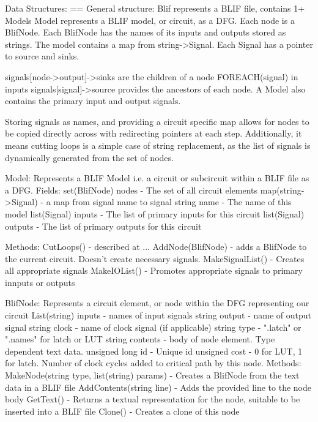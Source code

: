 \documentclass[12pt,draft,oneside]{article} %
\begin{document}
Data Structures:
==
General structure:
Blif represents a BLIF file, contains 1+ Models
Model represents a BLIF model, or circuit, as a DFG.
Each node is a BlifNode.
Each BlifNode has the names of its inputs and outputs stored as strings.
The model contains a map from string->Signal.
Each Signal has a pointer to source and sinks.

signals[node->output]->sinks are the children of a node
FOREACH(signal) in inputs
   signals[signal]->source
provides the ancestors of each node.
A Model also contains the primary input and output signals.

Storing signals as names, and providing a circuit specific map allows for nodes
to be copied directly across with redirecting pointers at each step.
Additionally, it means cutting loops is a simple case of string replacement,
as the list of signals is dynamically generated from the set of nodes.

Model: Represents a BLIF Model i.e. a circuit or subcircuit within a BLIF file
as a DFG.
Fields:
   set(BlifNode) nodes - The set of all circuit elements
   map(string->Signal) - a map from signal name to signal
   string name - The name of this model
   list(Signal) inputs - The list of primary inputs for this circuit
   list(Signal) outputs - The list of primary outputs for this circuit

Methods:
   CutLoops() - described at ...
   AddNode(BlifNode) - adds a BlifNode to the current circuit. Doesn't create
   necessary signals.
   MakeSignalList() - Creates all appropriate signals
   MakeIOList() - Promotes appropriate signals to primary innputs or outputs

BlifNode: Represents a circuit element, or node within the DFG representing
our circuit
   List(string) inputs - names of input signals
   string output - name of output signal
   string clock - name of clock signal (if applicable)
   string type - ".latch" or ".names" for latch or LUT
   string contents - body of node element. Type dependent text data.
   unsigned long id - Unique id
   unsigned cost - 0 for LUT, 1 for latch. Number of clock cycles added to
   critical path by this node.
Methods:
   MakeNode(string type, list(string) params) - Creates a BlifNode from the
   text data in a BLIF file
   AddContents(string line) - Adds the provided line to the node body
   GetText() - Returns a textual representation for the node, suitable to be
   inserted into a BLIF file
   Clone() - Creates a clone of this node
\end{document}
